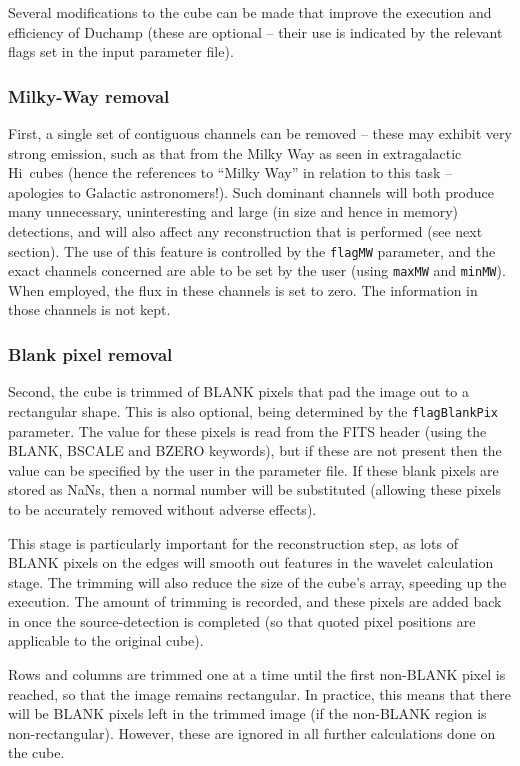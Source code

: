 \documentclass[12pt]{article}
\newcommand{\hi}{H{\sc i}}
\begin{document}
Several modifications to the cube can be made that improve the
execution and efficiency of Duchamp (these are optional -- their
use is indicated by the relevant flags set in the input parameter
file).

\subsubsection{Milky-Way removal}

First, a single set of contiguous channels can be removed -- these may
exhibit very strong emission, such as that from the Milky Way as seen
in extragalactic \hi\ cubes (hence the references to ``Milky Way'' in
relation to this task -- apologies to Galactic astronomers!). Such
dominant channels will both produce many unnecessary, uninteresting
and large (in size and hence in memory) detections, and will also
affect any reconstruction that is performed (see next section). The
use of this feature is controlled by the {\tt flagMW} parameter, and
the exact channels concerned are able to be set by the user (using
{\tt maxMW} and {\tt minMW}). When employed, the flux in these
channels is set to zero. The information in those channels is not
kept.

\subsubsection{Blank pixel removal}

Second, the cube is trimmed of BLANK pixels that pad the image
out to a rectangular shape. This is also optional, being determined by
the {\tt flagBlankPix} parameter. The value for these pixels is read from
the FITS header (using the BLANK, BSCALE and BZERO keywords), but if
these are not present then the value can be specified by the user in
the parameter file. If these blank pixels are stored as NaNs, then a
normal number will be substituted (allowing these pixels to be
accurately removed without adverse effects).

This stage is particularly important for the reconstruction step, as
lots of BLANK pixels on the edges will smooth out features in the
wavelet calculation stage. The trimming will also reduce the size of
the cube's array, speeding up the execution. The amount of trimming is
recorded, and these pixels are added back in once the source-detection
is completed (so that quoted pixel positions are applicable to the
original cube).

Rows and columns are trimmed one at a time until the first non-BLANK
pixel is reached, so that the image remains rectangular. In practice,
this means that there will be BLANK pixels left in the trimmed image
(if the non-BLANK region is non-rectangular). However, these are
ignored in all further calculations done on the cube.
\end{document}

